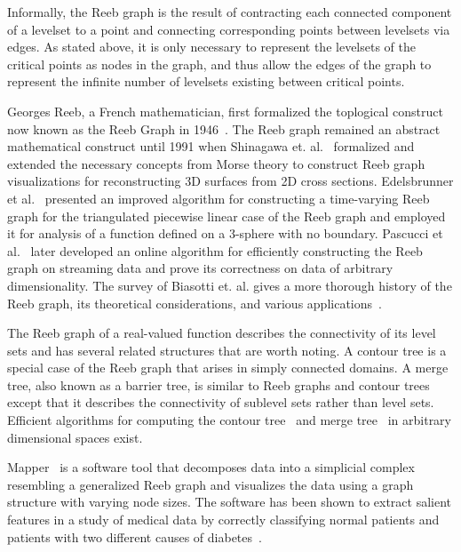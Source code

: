 Informally, the Reeb graph is the result of contracting each connected component of a levelset to a point and connecting corresponding points between levelsets via edges.
%
As stated above, it is only necessary to represent the levelsets of the critical points as nodes in the graph, and thus allow the edges of the graph to represent the infinite number of levelsets existing between critical points.

Georges Reeb, a French mathematician, first formalized the toplogical construct now known as the Reeb Graph in 1946~\cite{Reeb1946}.
%
The Reeb graph remained an abstract mathematical construct until 1991 when Shinagawa et. al.~\cite{ShinagawaKuniiKergosien1991} formalized and extended the necessary concepts from Morse theory to construct Reeb graph visualizations for reconstructing 3D surfaces from 2D cross sections.
%
Edelsbrunner et al.~\cite{EdelsbrunnerHarerMascarenhas2008} presented an improved algorithm for constructing a time-varying Reeb graph for the triangulated piecewise linear case of the Reeb graph and employed it for analysis of a function defined on a 3-sphere with no boundary.
%
Pascucci et al.~\cite{PascucciScorzelliBremer2007} later developed an online algorithm for efficiently constructing the Reeb graph on streaming data and prove its correctness on data of arbitrary dimensionality.
%
The survey of Biasotti et. al. gives a more thorough history of the Reeb graph, its theoretical considerations, and various applications~\cite{BiasottiGiorgiSpagnuolo2008}.


The Reeb graph of a real-valued function describes the connectivity of its level sets and has several related structures that are worth noting.
%
A contour tree is a special case of the Reeb graph that arises in simply connected domains.
%
A merge tree, also known as a barrier tree, is similar to Reeb graphs and contour trees except that it describes the connectivity of sublevel sets rather than level sets.
%
Efficient algorithms for computing the contour tree~\cite{CarrSnoeyinkAxen2003, ChiangLenzLu2005} and merge tree~\cite{OesterlingHeineWeber2015} in arbitrary dimensional spaces exist.

Mapper~\cite{SinghMemoliCarlsson2007} is a software tool that decomposes data into a simplicial complex resembling a generalized Reeb graph and visualizes the data using a graph structure with varying node sizes.
%
The software has been shown to extract salient features in a study of medical data by correctly classifying normal patients and patients with two different causes of diabetes~\cite{SarikondaPettusPhatak2014}.

